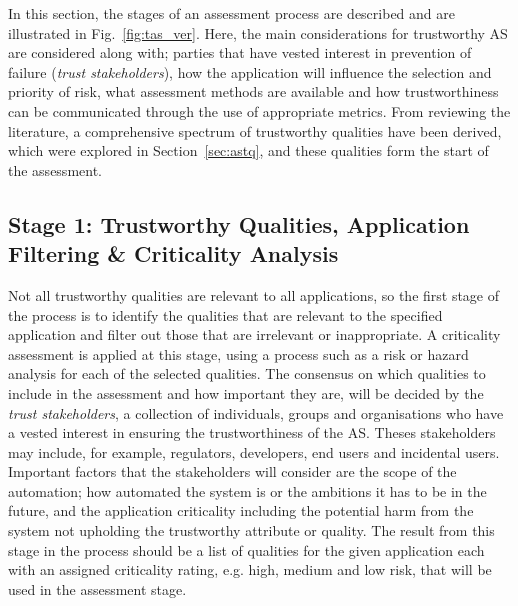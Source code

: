 In this section, the stages of an assessment process are described and are illustrated in Fig.~\ref{fig:tas_ver}. Here, the main considerations for trustworthy AS are considered along with; parties that have vested interest in prevention of failure (\emph{trust stakeholders}), how the application will influence the selection and priority of risk, what assessment methods are available and how trustworthiness can be communicated through the use of appropriate metrics. 
%
From reviewing the literature, a comprehensive spectrum of trustworthy qualities have been derived, which were explored in Section~\ref{sec:astq}, and these qualities form the start of the assessment.



\subsection{Stage 1: Trustworthy Qualities, Application Filtering \& Criticality Analysis}

Not all trustworthy qualities are relevant to all applications, so the first stage of the process is to identify the qualities that are relevant to the specified application and filter out those that are irrelevant or inappropriate. 
%
A criticality assessment is applied at this stage, using a process such as a risk or hazard analysis for each of the selected qualities. 
%
The consensus on which qualities to include in the assessment and how important they are, will be decided by the \emph{trust stakeholders}, a collection of individuals, groups and organisations who have a vested interest in ensuring the trustworthiness of the AS. Theses stakeholders may include, for example, regulators, developers, end users and incidental users. 
%
Important factors that the stakeholders will consider are the scope of the automation; how automated the system is or the ambitions it has to be in the future, and the application criticality including the potential harm from the system not upholding the trustworthy attribute or quality. 
%
The result from this stage in the process should be a list of qualities for the given application each with an assigned criticality rating, e.g. high, medium and low risk, that will be used in the assessment stage. 

